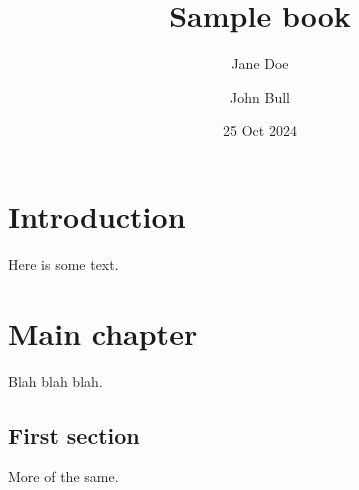 \documentclass{amsbook}
\title{Sample book}
\author{Jane Doe}
\author{John Bull}
\date{25 Oct 2024}
\begin{document}

\frontmatter

\maketitle

\chapter*{Introduction}

Here is some text.

\mainmatter

\chapter{Main chapter}

Blah blah blah.

\section{First section}

More of the same.
\end{document}
